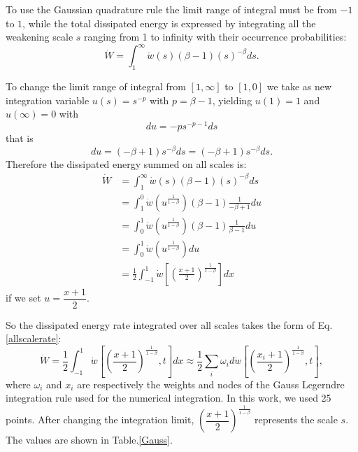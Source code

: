 \documentclass[3p,times,procedia,number]{elsarticle}
\begin{document}
To use the Gaussian quadrature rule the limit range of integral must be from $-1$ to $1$, while the total dissipated energy  is expressed by integrating all the weakening scale $s$ ranging from 1 to infinity with their occurrence probabilities:
$$\dot{W}=\int_{1}^{\infty}\dot{w}(s) (\beta-1)(s)^{-\beta}ds.$$

\noindent
To change the limit range of integral from $[1,\infty]$ to $[1,0]$ we take as new integration variable
$u(s)= s^{-p}$ with $p=\beta-1$, yielding $u(1)=1$ and  $u(\infty)=0$ with
$$du=-ps^{-p-1}ds$$ 
that is
$$du=(-\beta+1) s^{-\beta}ds=(-\beta+1)s^{-\beta} ds.$$
Therefore the dissipated energy summed on all scales is:
\begin{equation}
	\begin{split}
		\dot{W}&=\int_{1}^{\infty}\dot{w}(s) (\beta-1)(s)^{-\beta}ds
		\\&=\int_{1}^{0}\dot{w}\left( u^{\frac{1}{1-\beta}}\right) (\beta-1) \frac{1}{-\beta+1}du
		\\&=\int_{0}^{1}\dot{w}\left( u^{\frac{1}{1-\beta}}\right) (\beta-1) \frac{1}{\beta-1}du
		\\&=\int_{0}^{1}\dot{w}\left( u^{\frac{1}{1-\beta}}\right)du
		\\&=\frac{1}{2}\int_{-1}^{1}\dot{w}\left[  \left( \frac{x+1}{2}\right) ^{\frac{1}{1-\beta}}\right] dx
	\end{split}
	\label{allscale}
\end{equation}
if we set $u=\dfrac{x+1}{2}$.

So the dissipated energy rate integrated over all scales takes the form of Eq.\eqref{allscalerate}:
\begin{equation}
	\dot{W}=\frac{1}{2}\int_{-1}^{1}\dot{w}\left[  \left( \frac{x+1}{2}\right) ^{\frac{1}{1-\beta}},t\right] dx\approx\frac{1}{2}\sum_{i}\omega_id\dot{w}\left[  \left( \frac{x_i+1}{2}\right) ^{\frac{1}{1-\beta}},t\right],
	\label{allscalerate}
\end{equation}
where $\omega_i$ and $x_i$ are respectively the weights and nodes of the Gauss Legerndre integration rule used for the numerical integration. In this work, we used 25 points\cite{legendre}. After changing the integration limit, $\left( \dfrac{x+1}{2}\right) ^{\frac{1}{1-\beta}}$ represents the scale $s$. The values are shown in Table.\ref{Gauss}. 
\end{document}
